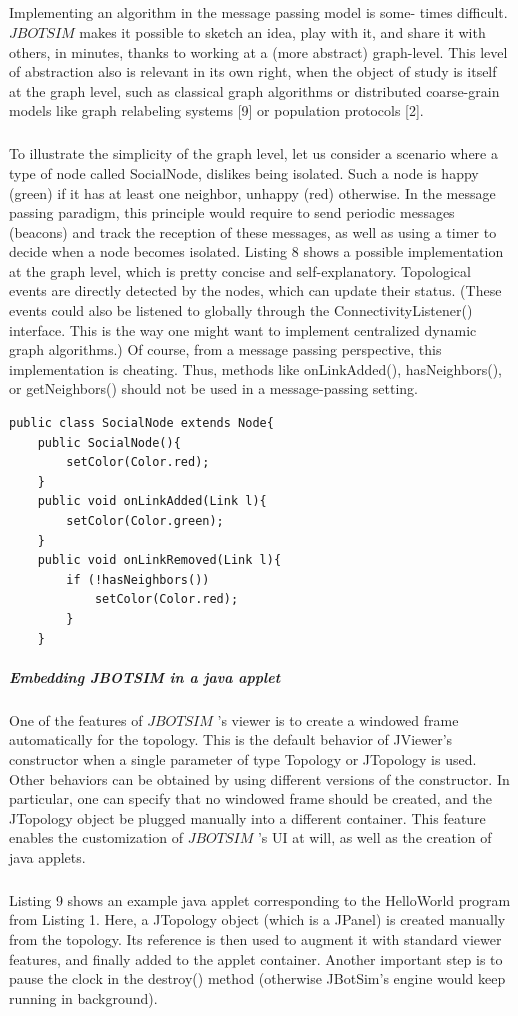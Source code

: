 \subparagraph{}Implementing an algorithm in the message passing model is some- times difficult. $JBOTSIM$ makes it possible to sketch an idea, play with it, and share it with others, in minutes, thanks to working at a (more abstract) graph-level. This level of abstraction also is relevant in its own right, when the object of study is itself at the graph level, such as classical graph algorithms or distributed coarse-grain models like graph relabeling systems [9] or population protocols [2].
\subparagraph{}To illustrate the simplicity of the graph level, let us consider a scenario where a type of node called SocialNode, dislikes being isolated. Such a node is happy (green) if it has at least one neighbor, unhappy (red) otherwise. In the message passing paradigm, this principle would require to send periodic messages (beacons) and track the reception of these messages, as well as using a timer to decide when a node becomes isolated. Listing 8 shows a possible implementation at the graph level, which is pretty concise and self-explanatory. Topological events are directly detected by the nodes, which can update their status. (These events could also be listened to globally through the ConnectivityListener() interface. This is the way one might want to implement centralized dynamic graph algorithms.) Of course, from a message passing perspective, this implementation is cheating. Thus, methods like onLinkAdded(), hasNeighbors(), or getNeighbors() should not be used in a message-passing setting.

\begin{lstlisting}[caption=Example of graph-based algorithm, captionpos=b]
public class SocialNode extends Node{
	public SocialNode(){
		setColor(Color.red);
	}
	public void onLinkAdded(Link l){
		setColor(Color.green);
	}
	public void onLinkRemoved(Link l){
		if (!hasNeighbors())
			setColor(Color.red);
		}
	}
\end{lstlisting}
\subparagraph{Embedding JBOTSIM in a java applet}One of the features of  $JBOTSIM$ ’s viewer is to create a windowed frame automatically for the topology. This is the default behavior of JViewer’s constructor when a single parameter of type Topology or JTopology is used. Other behaviors can be obtained by using different versions of the constructor. In particular, one can specify that no windowed frame should be created, and the JTopology object be plugged manually into a different container. This feature enables the customization of  $JBOTSIM$ ’s UI at will, as well as the creation of java applets.
\subparagraph{}Listing 9 shows an example java applet corresponding to the HelloWorld program from Listing 1. Here, a JTopology object (which is a JPanel) is created manually from the topology. Its reference is then used to augment it with standard viewer features, and finally added to the applet container. Another important step is to pause the clock in the destroy() method (otherwise JBotSim’s engine would keep running in background).

